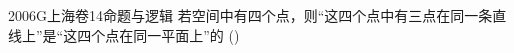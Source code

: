 
\begin{problem}{2006}{G}{上海卷}{14}{命题与逻辑}
若空间中有四个点，则“这四个点中有三点在同一条直线上”是“这四个点在同一平面上”的 (\hspace{1cm})

\begin{choices}
\end{choices}
\end{problem}

\begin{answer}

\end{answer}

\begin{solutions}

\end{solutions}